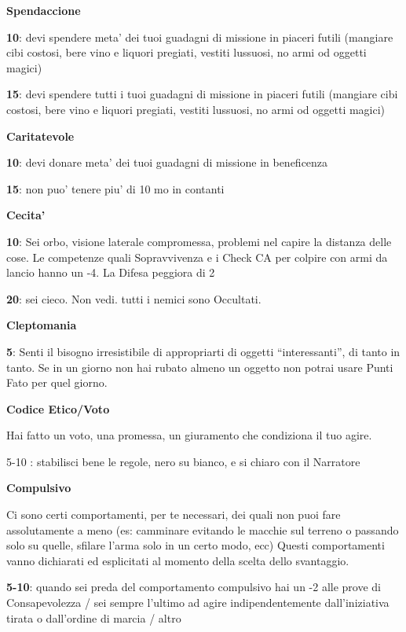\documentclass[a4paper,11pt,twoside,openany]{book}
\begin{document}
{		\textbf{Spendaccione}
		
		\textbf{10}: devi spendere meta' dei tuoi guadagni di missione in piaceri futili (mangiare cibi costosi, bere vino e liquori pregiati, vestiti lussuosi, no armi od oggetti magici)
		
		\textbf{15}: devi spendere tutti i tuoi guadagni di missione in piaceri futili (mangiare cibi costosi, bere vino e liquori pregiati, vestiti lussuosi, no armi od oggetti magici)
		
		\textbf{Caritatevole}
		
		\textbf{10}: devi donare meta' dei tuoi guadagni di missione in beneficenza
		
		\textbf{15}: non puo' tenere piu' di 10 mo in contanti
		
		\textbf{Cecita'}
		
		\textbf{10}: Sei orbo, visione laterale compromessa, problemi nel capire la distanza delle cose.
		Le competenze quali Sopravvivenza e i Check CA per colpire con armi da lancio hanno
		un -4. La Difesa peggiora di 2
		
		\textbf{20}: sei cieco. Non vedi. tutti i nemici sono Occultati.
		
		\textbf{Cleptomania}
		
		\textbf{5}: Senti il bisogno irresistibile di appropriarti di oggetti “interessanti”, di tanto in tanto. Se in un giorno non hai rubato almeno un oggetto non potrai usare Punti Fato per quel giorno.
		
		\textbf{Codice Etico/Voto}
		
		Hai fatto un voto, una promessa, un giuramento che condiziona il tuo agire.
		
		5-10 : stabilisci bene le regole, nero su bianco, e si chiaro con il Narratore
		
		\textbf{Compulsivo}
		
		Ci sono certi comportamenti, per te necessari, dei quali non puoi fare assolutamente a meno (es: camminare evitando le macchie sul terreno o passando solo su quelle, sfilare l'arma solo in un certo modo, ecc) 
		Questi comportamenti vanno dichiarati ed esplicitati al momento della scelta dello svantaggio.
		
		\textbf{5-10}: quando sei preda del comportamento compulsivo hai un -2 alle prove di Consapevolezza / sei sempre l'ultimo ad agire indipendentemente dall'iniziativa tirata o dall'ordine di marcia / altro
		
}
\end{document}
